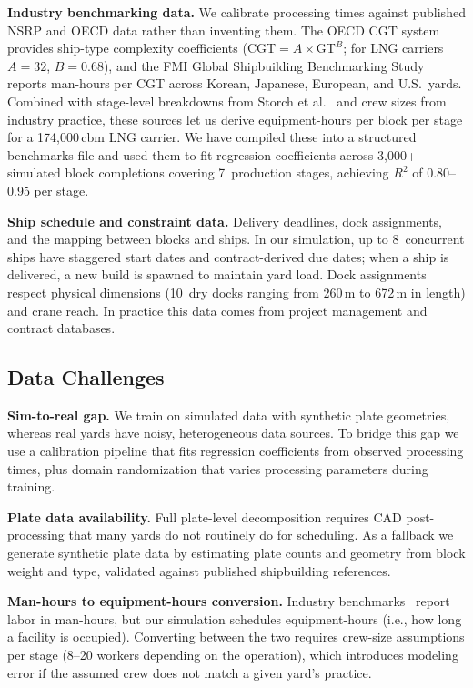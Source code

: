 \documentclass[12pt,letterpaper]{article}
\begin{document}
\textbf{Industry benchmarking data.} We calibrate processing times against published NSRP and OECD data rather than inventing them. The OECD CGT system~\cite{oecd2007} provides ship-type complexity coefficients ($\text{CGT} = A \times \text{GT}^B$; for LNG carriers $A{=}32$, $B{=}0.68$), and the FMI Global Shipbuilding Benchmarking Study~\cite{fmi2005} reports man-hours per CGT across Korean, Japanese, European, and U.S.\ yards. Combined with stage-level breakdowns from Storch et al.~\cite{storch1995} and crew sizes from industry practice, these sources let us derive equipment-hours per block per stage for a 174,000\,cbm LNG carrier. We have compiled these into a structured benchmarks file and used them to fit regression coefficients across 3,000+ simulated block completions covering 7~production stages, achieving $R^2$ of 0.80--0.95 per stage.

\textbf{Ship schedule and constraint data.} Delivery deadlines, dock assignments, and the mapping between blocks and ships. In our simulation, up to 8~concurrent ships have staggered start dates and contract-derived due dates; when a ship is delivered, a new build is spawned to maintain yard load. Dock assignments respect physical dimensions (10~dry docks ranging from 260\,m to 672\,m in length) and crane reach. In practice this data comes from project management and contract databases.

\subsection{Data Challenges}

\textbf{Sim-to-real gap.} We train on simulated data with synthetic plate geometries, whereas real yards have noisy, heterogeneous data sources. To bridge this gap we use a calibration pipeline that fits regression coefficients from observed processing times, plus domain randomization that varies processing parameters during training.

\textbf{Plate data availability.} Full plate-level decomposition requires CAD post-processing that many yards do not routinely do for scheduling. As a fallback we generate synthetic plate data by estimating plate counts and geometry from block weight and type, validated against published shipbuilding references.

\textbf{Man-hours to equipment-hours conversion.} Industry benchmarks~\cite{fmi2005,storch1995} report labor in man-hours, but our simulation schedules equipment-hours (i.e., how long a facility is occupied). Converting between the two requires crew-size assumptions per stage (8--20 workers depending on the operation), which introduces modeling error if the assumed crew does not match a given yard's practice.
\end{document}
